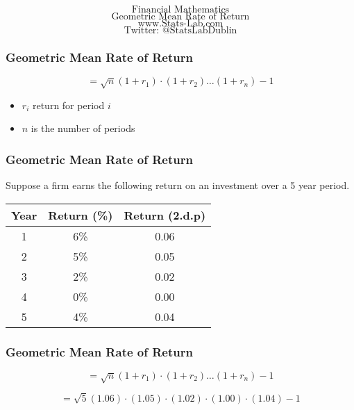 \documentclass{beamer}
\begin{document}
\begin{frame}
\Huge
\[ \mbox{Financial Mathematics}  \]
\huge
\[ \mbox{Geometric Mean Rate of Return}\]
\Large
\[ \mbox{www.Stats-Lab.com}   \]
\[ \mbox{Twitter: @StatsLabDublin} \]
\end{frame}
\begin{frame}
\frametitle{Geometric Mean Rate of Return}
\Large
\[ = \sqrt{n}{(1+r_1)\cdot(1+r_2)\ldots(1+r_n)} - 1
\]
\begin{itemize}
\item $r_i$ return for period $i$
\item $n$ is the number of periods
\end{itemize}
\end{frame}
\begin{frame}
\frametitle{Geometric Mean Rate of Return}
\Large
Suppose a firm earns the following return on an investment over a 5 year period.
\begin{tabular}{|c|c|c|}
\hline Year & Return (\%) & Return (2.d.p)\\ 
\hline 1 & 6\% & 0.06 \\ 
\hline 2 & 5\% & 0.05\\ 
\hline 3 & 2\% & 0.02\\ 
\hline 4 & 0\% & 0.00\\
\hline 5 & 4\% & 0.04\\
\hline 
\end{tabular} 
\end{frame}
\begin{frame}
\frametitle{Geometric Mean Rate of Return}
\Large
\[ = \sqrt{n}{(1+r_1)\cdot(1+r_2)\ldots(1+r_n)} - 1
\]

\[ = \sqrt{5}{(1.06)\cdot(1.05)\cdot(1.02)\cdot(1.00)\cdot(1.04)} - 1
\]
\end{frame}
\end{document}
